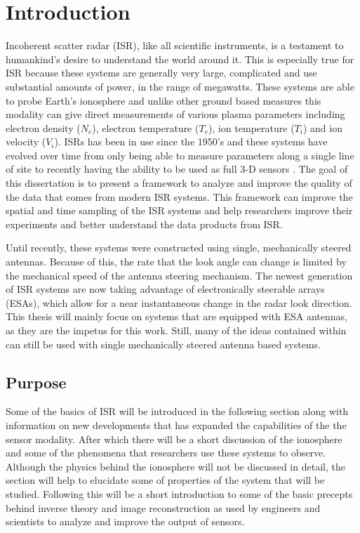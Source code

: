 \chapter{Introduction}
\label{chapter:body}
\thispagestyle{myheadings}
\setcounter{tocdepth}{1}
\graphicspath{{1_Intro/Figures/}}

Incoherent scatter radar (ISR), like all scientific instruments, is a testament to humankind's desire to understand the world around it. This is especially true for ISR because these systems are generally very large, complicated and use substantial amounts of power, in the range of megawatts. These systems are able to probe Earth's ionosphere and unlike other ground based measures this modality can give direct measurements of various plasma parameters including electron density ($N_e$), electron temperature ($T_e$), ion temperature ($T_i$) and ion velocity ($V_i$). ISRs has been in use since the 1950's \cite{gordon58} and these systems have evolved over time from only being able to measure parameters along a single line of site to recently having the ability to be used as full 3-D sensors \cite{Semeter2009738,Nicolls:2007ie}. The goal of this dissertation is to present a framework to analyze and improve the quality of the data that comes from modern ISR systems. This framework can  improve the spatial and time sampling of the ISR systems and help researchers improve their experiments and better understand the data products from ISR.

Until recently, these systems were constructed using single, mechanically steered antennas. Because of this, the rate that the look angle can change is limited by the mechanical speed of the antenna steering mechanism. The newest generation of ISR systems are now taking advantage of electronically steerable arrays (ESAs), which allow for a near instantaneous change in the radar look direction. This thesis will mainly focus on systems that are equipped with ESA antennas, as they are the impetus for this work. Still, many of the ideas contained within can still be used with single mechanically steered antenna based systems. 
 
\section{Purpose}
Some of the basics of ISR will be introduced in the following section along with information on new developments that has expanded the capabilities of the the sensor modality. After which there will be a short discussion of the ionosphere and some of the phenomena that researchers use these systems to observe. Although the physics behind the ionosphere will not be discussed in detail, the section will help to elucidate some of properties of the system that will be studied. Following this will be a short introduction to some of the basic precepts behind inverse theory and image reconstruction as used by engineers and scientists to analyze and improve the output of sensors.

